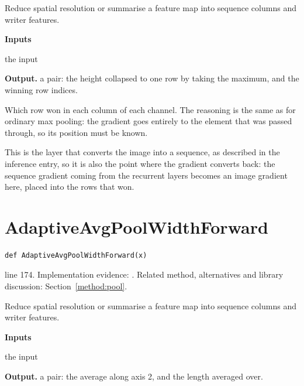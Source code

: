 Reduce spatial resolution or summarise a feature map into sequence columns and writer features.




\noindent\textbf{Inputs}
\begin{description}[leftmargin=2.2em,style=nextline,font=\normalfont\ttfamily]\setlength\itemsep{1pt}
  \item[{x}] \normalfont the input
\end{description}

\noindent\textbf{Output.} a pair: the height collapsed to one row by taking the maximum, and the winning row indices.


Which row won in each column of each channel. The reasoning is the same as for ordinary max pooling: the gradient goes entirely to the element that was passed through, so its position must be known.

This is the layer that converts the image into a sequence, as described in the inference entry, so it is also the point where the gradient converts back: the sequence gradient coming from the recurrent layers becomes an image gradient here, placed into the rows that won.



\section{AdaptiveAvgPoolWidthForward}\label{fn:train:AdaptiveAvgPoolWidthForward}
\begin{lstlisting}[style=sig]
def AdaptiveAvgPoolWidthForward(x)
\end{lstlisting}
 line 174. Implementation evidence: \cite{code2026}. Related method, alternatives and library discussion: Section~\ref{method:pool}.


Reduce spatial resolution or summarise a feature map into sequence columns and writer features.




\noindent\textbf{Inputs}
\begin{description}[leftmargin=2.2em,style=nextline,font=\normalfont\ttfamily]\setlength\itemsep{1pt}
  \item[{x}] \normalfont the input
\end{description}

\noindent\textbf{Output.} a pair: the average along axis 2, and the length averaged over.



